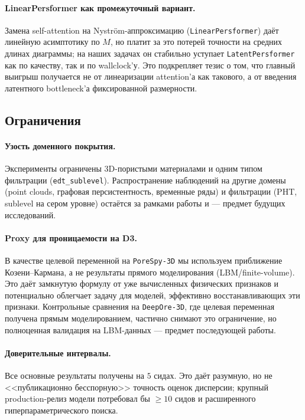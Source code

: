 \paragraph{LinearPersformer как промежуточный вариант.} Замена self-attention на Nystr{\"o}m-аппроксимацию (\texttt{LinearPersformer}) даёт линейную асимптотику по $M$, но платит за это потерей точности на средних длинах диаграммы; на наших задачах он стабильно уступает \texttt{LatentPersformer} как по качеству, так и по wallclock'у. Это подкрепляет тезис о том, что главный выигрыш получается не от линеаризации attention'а как такового, а от введения латентного bottleneck'а фиксированной размерности.

\subsection{Ограничения}

\paragraph{Узость доменного покрытия.} Эксперименты ограничены 3D-пористыми материалами и одним типом фильтрации (\texttt{edt\_sublevel}). Распространение наблюдений на другие домены (point clouds, графовая персистентность, временные ряды) и фильтрации (PHT, sublevel на сером уровне) остаётся за рамками работы и --- предмет будущих исследований.

\paragraph{Proxy для проницаемости на D3.} В качестве целевой переменной на \texttt{PoreSpy-3D} мы используем приближение Козени--Кармана, а не результаты прямого моделирования (LBM/finite-volume). Это даёт замкнутую формулу от уже вычисленных физических признаков и потенциально облегчает задачу для моделей, эффективно восстанавливающих эти признаки. Контрольные сравнения на \texttt{DeepOre-3D}, где целевая переменная получена прямым моделированием, частично снимают это ограничение, но полноценная валидация на LBM-данных --- предмет последующей работы.

\paragraph{Доверительные интервалы.} Все основные результаты получены на $5$ сидах. Это даёт разумную, но не <<публикационно бесспорную>> точность оценок дисперсии; крупный production-релиз модели потребовал бы $\geq 10$ сидов и расширенного гиперпараметрического поиска.

